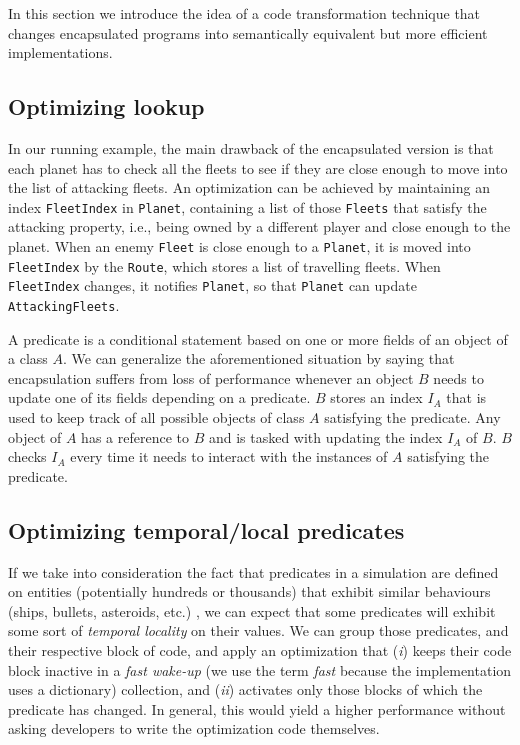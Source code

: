 In this section we introduce the idea of a code transformation technique that changes encapsulated programs into semantically equivalent but more efficient implementations.

\subsection{Optimizing lookup}

In our running example, the main drawback of the encapsulated version is that each planet has to check all the fleets to see if they are close enough to move into the list of attacking fleets. An optimization can be achieved by maintaining an index \texttt{FleetIndex} in \texttt{Planet}, containing a list of those \texttt{Fleets} that satisfy the attacking property, i.e., being owned by a different player and close enough to the planet. When an enemy \texttt{Fleet} is close enough to a \texttt{Planet}, it is moved into \texttt{FleetIndex} by the \texttt{Route}, which stores a list of travelling fleets. When \texttt{FleetIndex} changes, it notifies \texttt{Planet}, so that \texttt{Planet} can update \texttt{AttackingFleets}.

A predicate is a conditional statement based on one or more fields of an object of a class $A$. We can generalize the aforementioned situation by saying that encapsulation suffers from loss of performance whenever an object $B$ needs to update one of its fields depending on a predicate. $B$ stores an index $I_{A}$ that is used to keep track of all possible objects of class $A$ satisfying the predicate. Any object of $A$ has a reference to $B$ and is tasked with updating the index $I_{A}$ of $B$. $B$ checks $I_{A}$ every time it needs to interact with the instances of $A$ satisfying the predicate.

\subsection{Optimizing temporal/local predicates}

If we take into consideration the fact that predicates in a simulation are defined on entities (potentially hundreds or thousands) that exhibit similar behaviours (ships, bullets, asteroids, etc.) \cite{ai_dithering}, we can expect that some predicates will exhibit some sort of \textit{temporal locality} on their values. We can group those predicates, and their respective block of code, and apply an optimization that (\textit{i}) keeps their code block inactive in a \textit{fast wake-up} (we use the term \textit{fast} because the implementation uses a dictionary) collection, and (\textit{ii}) activates only those blocks of which the predicate has changed. In general, this would yield a higher performance without asking developers to write the optimization code themselves.

